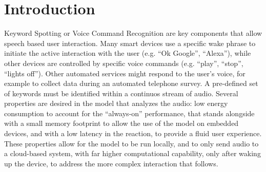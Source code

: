 
\section{Introduction}
\label{sec:introduction}


Keyword Spotting or Voice Command Recognition are key components that allow
speech based user interaction.
%
Many smart devices use a specific wake phrase to initiate the active
interaction with the user (e.g. ``Ok Google'', ``Alexa''), while other devices
are controlled by specific voice commands (e.g. ``play'', ``stop'', ``lights
off'').
%
Other automated services might respond to the user's voice, for example to
collect data during an automated telephone survey.
%
A pre-defined set of keywords must be identified within a continuos stream of
audio. Several properties are desired in the model that analyzes the audio: low
energy consumption to account for the ``always-on'' performance, that stands
alongside with a small memory footprint to allow the use of the model on
embedded devices, and with a low latency in the reaction, to provide a fluid
user experience.
%
These properties allow for the model to be run locally, and to only send audio
to a cloud-based system, with far higher computational capability, only after
waking up the device, to address the more complex interaction that follows.



